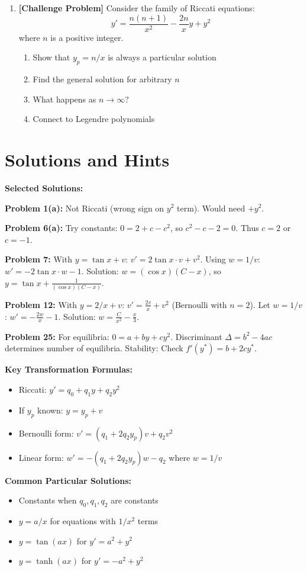 \documentclass[12pt]{article}
\begin{document}
\begin{enumerate}[resume]
    \item \textbf{[Challenge Problem]}
    Consider the family of Riccati equations:
    $$y' = \frac{n(n+1)}{x^2} - \frac{2n}{x}y + y^2$$
    where $n$ is a positive integer.
    \begin{enumerate}[label=(\alph*)]
        \item Show that $y_p = n/x$ is always a particular solution
        \item Find the general solution for arbitrary $n$
        \item What happens as $n \to \infty$?
        \item Connect to Legendre polynomials
    \end{enumerate}
\end{enumerate}

\section*{Solutions and Hints}

\textbf{Selected Solutions:}

\textbf{Problem 1(a):} Not Riccati (wrong sign on $y^2$ term). Would need $+y^2$.

\textbf{Problem 6(a):} Try constants: $0 = 2 + c - c^2$, so $c^2 - c - 2 = 0$. Thus $c = 2$ or $c = -1$.

\textbf{Problem 7:} With $y = \tan x + v$: $v' = 2\tan x \cdot v + v^2$.
Using $w = 1/v$: $w' = -2\tan x \cdot w - 1$.
Solution: $w = (\cos x)(C - x)$, so $y = \tan x + \frac{1}{(\cos x)(C - x)}$.

\textbf{Problem 12:} With $y = 2/x + v$:
$v' = \frac{2v}{x} + v^2$ (Bernoulli with $n = 2$).
Let $w = 1/v$: $w' = -\frac{2w}{x} - 1$.
Solution: $w = \frac{C}{x^2} - \frac{x}{3}$.

\textbf{Problem 25:} For equilibria: $0 = a + by + cy^2$.
Discriminant $\Delta = b^2 - 4ac$ determines number of equilibria.
Stability: Check $f'(y^*) = b + 2cy^*$.

\textbf{Key Transformation Formulas:}
\begin{itemize}
    \item Riccati: $y' = q_0 + q_1y + q_2y^2$
    \item If $y_p$ known: $y = y_p + v$
    \item Bernoulli form: $v' = (q_1 + 2q_2y_p)v + q_2v^2$
    \item Linear form: $w' = -(q_1 + 2q_2y_p)w - q_2$ where $w = 1/v$
\end{itemize}

\textbf{Common Particular Solutions:}
\begin{itemize}
    \item Constants when $q_0, q_1, q_2$ are constants
    \item $y = a/x$ for equations with $1/x^2$ terms
    \item $y = \tan(ax)$ for $y' = a^2 + y^2$
    \item $y = \tanh(ax)$ for $y' = -a^2 + y^2$
\end{itemize}
\end{document}
